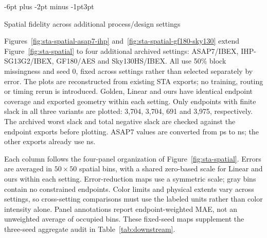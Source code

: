 \documentclass{article}
\makeatletter
\renewcommand{\subsection}{\@startsection{subsection}{2}{\z@}
  {-6pt plus -2pt minus -1pt}{3pt}{\normalsize\sc\raggedright}}
\makeatother
\begin{document}


\subsection{Spatial fidelity across additional process/design settings}
\label{app:sta-additional-spatial}

Figures~\ref{fig:sta-spatial-asap7-ihp} and~\ref{fig:sta-spatial-gf180-sky130}
extend Figure~\ref{fig:sta-spatial} to four additional archived settings:
ASAP7/IBEX, IHP-SG13G2/IBEX, GF180/AES and Sky130HS/IBEX.
All use 50\% block missingness and seed 0, fixed across settings rather than
selected separately by error. The plots are reconstructed from existing STA
exports; no training, routing or timing rerun is introduced.
Golden, Linear and ours have identical endpoint coverage and exported geometry
within each setting. Only endpoints with finite slack in all three variants
are plotted: 3,704, 3,704, 691 and 3,975, respectively.
The archived worst slack and total negative slack are checked against the
endpoint exports before plotting. ASAP7 values are converted from ps to ns;
the other exports already use ns.

Each column follows the four-panel organization of Figure~\ref{fig:sta-spatial}.
Errors are averaged in $50\times50$ spatial bins, with a shared zero-based scale
for Linear and ours within each setting. Error-reduction maps use a symmetric
scale; gray bins contain no constrained endpoints. Color limits and physical
extents vary across settings, so cross-setting comparisons must use the
labeled units rather than color intensity alone. Panel annotations report
endpoint-weighted MAE, not an unweighted average of occupied bins.
These fixed-seed maps supplement the three-seed aggregate audit in
Table~\ref{tab:downstream}.
\end{document}
